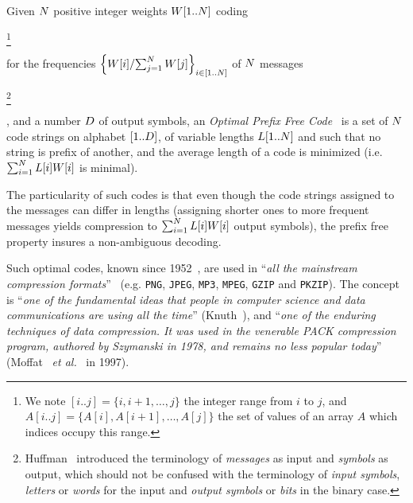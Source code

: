 \documentclass{llncs}
\providecommand{\etal}{~\emph{et al.}}
\providecommand{\nbWeights}{{\ensuremath N}}
\providecommand{\weight}[1]{{\ensuremath W[#1]}}
\providecommand{\nbSymbols}{{\ensuremath D}}
\providecommand{\codeLength}[1]{{\ensuremath L[#1]}}
\begin{document}
Given $\nbWeights$ positive integer weights $\weight{1..\nbWeights}$ coding\begin{VLONG}\footnote{We note $[i..j]=\{i,i+1,\ldots,j\}$ the integer range from $i$ to $j$, and $A[i..j]=\{A[i],A[i+1],\ldots,A[j]\}$ the set of values of an array $A$ which indices occupy this range.}\end{VLONG} for the frequencies $\left\{{\weight{i}}/{\sum_{j=1}^\nbWeights\weight{j}}\right\}_{i\in[1..\nbWeights]}$ of $\nbWeights$ messages\begin{VLONG}\footnote{Huffman~\cite{1952-IRE-AMethodForTheInstructionOfMinimumRedundancyCodes-Huffman} introduced the terminology of \emph{messages} as input and \emph{symbols} as output, which should not be confused with the terminology of \emph{input symbols}, \emph{letters} or \emph{words} for the input and \emph{output symbols} or \emph{bits} in the binary case.}\end{VLONG}, and a number $\nbSymbols$ of output symbols,
%
an \emph{Optimal Prefix Free Code}~\cite{1952-IRE-AMethodForTheInstructionOfMinimumRedundancyCodes-Huffman} is a set of $\nbWeights$ code strings on alphabet $[1..\nbSymbols]$, of variable lengths $\codeLength{1..\nbWeights}$ and such that no string is prefix of another, and the average length of a code is minimized (i.e. $\sum_{i=1}^\nbWeights\codeLength{i}\weight{i}$ is minimal).
%
\begin{LONG}
The particularity of such codes is that even though the code strings assigned to the messages can differ in lengths (assigning shorter ones to more frequent messages yields compression to $\sum_{i=1}^\nbWeights\codeLength{i}\weight{i}$ output symbols), the prefix free property insures a non-ambiguous decoding.
\end{LONG}
%
\begin{LONG}
Such optimal codes, known since
1952~\cite{1952-IRE-AMethodForTheInstructionOfMinimumRedundancyCodes-Huffman},
are used in ``\emph{all the mainstream compression  formats}''~\cite{2006-IEEE-LowPowerHuffmanCodingForHighPerformanceDataTransmission-Chen}
(e.g.  \texttt{PNG}, \texttt{JPEG}, \texttt{MP3}, \texttt{MPEG}, \texttt{GZIP} and \texttt{PKZIP}).
%
The concept is ``\emph{one of the {fundamental ideas that people} in computer science and data communications {are using all the time}}'' (Knuth~\cite{2010-BOOK-DiscreteMathematics-Chandrasekaran}), and ``\emph{one of the {enduring techniques of data compression}. It was used in the venerable PACK compression program, authored by Szymanski in 1978, and {remains no less popular today}}'' (Moffat \etal~\cite{1997-IEEE-OnTheImplementstionOfMinimumRedundsncyPrefixCodes-MoffatTurpin} in 1997).
\end{LONG}
\end{document}

